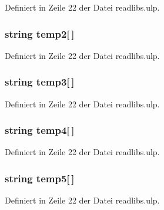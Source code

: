 Definiert in Zeile 22 der Datei readlibs.\+ulp.

\hypertarget{readlibs_8ulp_a93cd3f3f743b20e134149e06efa22a88}{}
\subsubsection[{temp2}]{\setlength{\rightskip}{0pt plus 5cm}string temp2\mbox{[}$\,$\mbox{]}}\label{readlibs_8ulp_a93cd3f3f743b20e134149e06efa22a88}


Definiert in Zeile 22 der Datei readlibs.\+ulp.

\hypertarget{readlibs_8ulp_a6d07a7b1d2f2bb3e3061eba3b676dd44}{}
\subsubsection[{temp3}]{\setlength{\rightskip}{0pt plus 5cm}string temp3\mbox{[}$\,$\mbox{]}}\label{readlibs_8ulp_a6d07a7b1d2f2bb3e3061eba3b676dd44}


Definiert in Zeile 22 der Datei readlibs.\+ulp.

\hypertarget{readlibs_8ulp_ad6a0fc9c82629f46ca764b920e57db24}{}
\subsubsection[{temp4}]{\setlength{\rightskip}{0pt plus 5cm}string temp4\mbox{[}$\,$\mbox{]}}\label{readlibs_8ulp_ad6a0fc9c82629f46ca764b920e57db24}


Definiert in Zeile 22 der Datei readlibs.\+ulp.

\hypertarget{readlibs_8ulp_ad5f54da751f4d315227472fb369d04b5}{}
\subsubsection[{temp5}]{\setlength{\rightskip}{0pt plus 5cm}string temp5\mbox{[}$\,$\mbox{]}}\label{readlibs_8ulp_ad5f54da751f4d315227472fb369d04b5}


Definiert in Zeile 22 der Datei readlibs.\+ulp.

\hypertarget{readlibs_8ulp_a03ca86bb44d6d953219c512adb218dbb}{}
